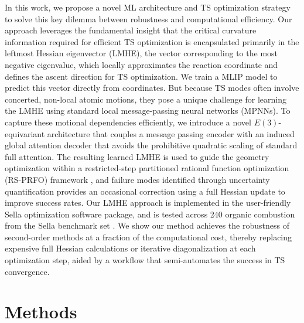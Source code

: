 \documentclass[12pt]{article}
\begin{document}
In this work, we propose a novel ML architecture and TS optimization strategy to solve this key dilemma between robustness and computational efficiency. Our approach leverages the fundamental insight that the critical curvature information required for efficient TS optimization is encapsulated primarily in the leftmost Hessian eigenvector (LMHE), the vector corresponding to the most negative eigenvalue, which locally approximates the reaction coordinate and defines the ascent direction for TS optimization. We train a MLIP model to predict this vector directly from coordinates. But because TS modes often involve concerted, non-local atomic motions, they pose a unique challenge for learning the LMHE using standard local message-passing neural networks (MPNNs). To capture these motional dependencies efficiently, we introduce a novel $E(3)$-equivariant architecture that couples a message passing encoder with an induced global attention decoder that avoids the prohibitive quadratic scaling of standard full attention. The resulting learned LMHE is used to guide the geometry optimization within a restricted-step partitioned rational function optimization (RS-PRFO) framework \cite{prfo1, prfo2, prfo3}, and failure modes identified through uncertainty quantification provides an occasional correction using a full Hessian update to improve success rates. Our LMHE approach is implemented in the user-friendly Sella optimization software package\cite{Sella}, and is tested across 240 organic combustion from the Sella benchmark set \cite{Sella}. We show our method achieves the robustness of second-order methods at a fraction of the computational cost, thereby replacing expensive full Hessian calculations or iterative diagonalization at each optimization step, aided by a workflow that semi-automates the success in TS convergence.\par

\section{Methods}
\end{document}
